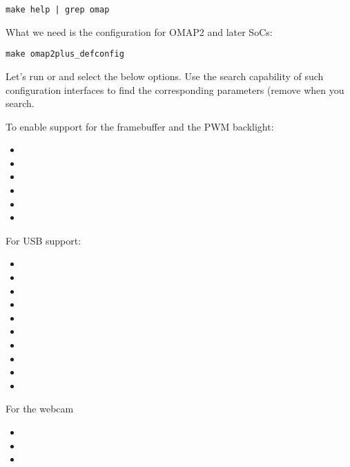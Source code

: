 \begin{verbatim}
make help | grep omap
\end{verbatim}

What we need is the configuration for OMAP2 and later SoCs:
\begin{verbatim}
make omap2plus_defconfig
\end{verbatim}

Let's run  or  and select the
below options. Use the search capability of such configuration
interfaces to find the corresponding parameters (remove 
when you search.

To enable support for the framebuffer and the PWM backlight:
\begin{itemize}
\item {}
\item {}
\item {}
\item {}
\item {}
\item {}
\end{itemize}

For USB support:
\begin{itemize}
\item {} 
\item {}
\item {}
\item {}
\item {}
\item {}
\item {}
\item {}
\item {}
\item {}
\end{itemize}

For the webcam
\begin{itemize}
\item {} 
\item {}
\item {}
\end{itemize}

